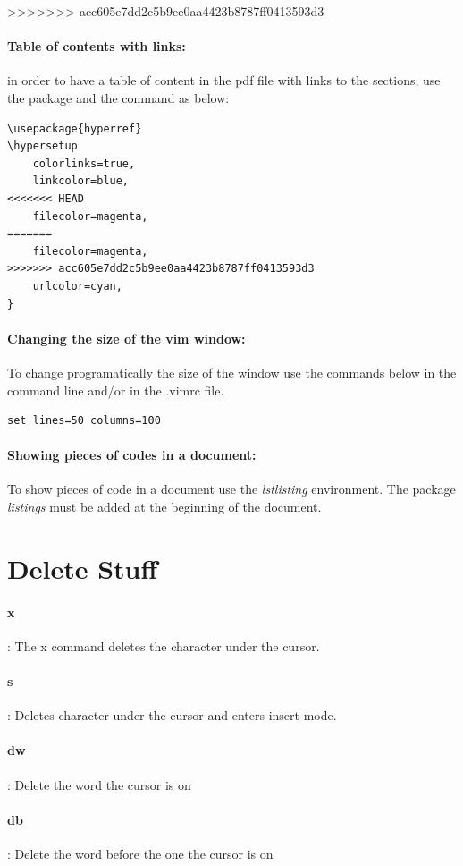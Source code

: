 \documentclass[10pt,letterpaper]{book}
\begin{document}
>>>>>>> acc605e7dd2c5b9ee0aa4423b8787ff0413593d3
\paragraph{Table of contents with links:} in order to have a table of content in the pdf file with links to the sections, use the package and the command as below:\\
\begin{lstlisting}
\usepackage{hyperref}
\hypersetup
    colorlinks=true,
    linkcolor=blue,
<<<<<<< HEAD
    filecolor=magenta,      
=======
    filecolor=magenta,
>>>>>>> acc605e7dd2c5b9ee0aa4423b8787ff0413593d3
    urlcolor=cyan,
}
\end{lstlisting}
\paragraph{Changing the size of the vim window:} To change programatically the size of the window use the commands below in the command line and/or in the .vimrc file.
\begin{lstlisting}
set lines=50 columns=100
\end{lstlisting}
\paragraph{Showing pieces of codes in a document:} To show pieces of code in a document use the \emph{lstlisting} environment. The package \emph{listings} must be added at the beginning of the document.
\section{Delete Stuff}
\paragraph{x}: The x command deletes the character under the cursor.
\paragraph{s}: Deletes character under the cursor and enters insert mode.
\paragraph{dw}: Delete the word the cursor is on
\paragraph{db}: Delete the word before the one the cursor is on
\end{document}
